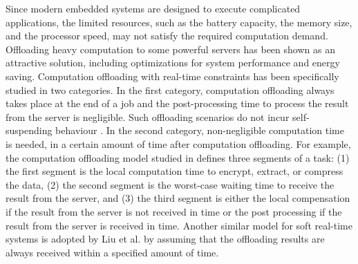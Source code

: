 Since modern embedded systems are designed to execute complicated applications, the limited resources, such as the battery capacity, the memory size, and the processor speed, may not satisfy the required computation demand. Offloading heavy computation to some powerful servers has been shown as an attractive solution, including optimizations for system performance and energy saving.
Computation offloading with real-time constraints has been specifically studied in two categories. In the first category, computation offloading always takes place at the end of a job and the post-processing time to process the result from the server is negligible. Such offloading scenarios do not incur self-suspending behaviour  \cite{nimmagadda2010real,DBLP:conf/ecrts/TomaC13}. In the second category, non-negligible computation time is needed, in a certain amount of time after computation offloading. For example, the computation offloading model studied in \cite{Liu_2014} defines three segments of a task: (1) the first segment is the local computation time to encrypt, extract, or compress the data, (2) the second segment is the worst-case waiting time to receive the result from the server, and (3) the third segment is either the local compensation if the result from the server is not received in time or the post processing if the result from the server is received in time. Another similar model for soft real-time systems is adopted by Liu et al. \cite{DBLP:conf/ecrts/LiuLZGH015} by assuming that the offloading results are always received within a specified amount of time.

  
  


